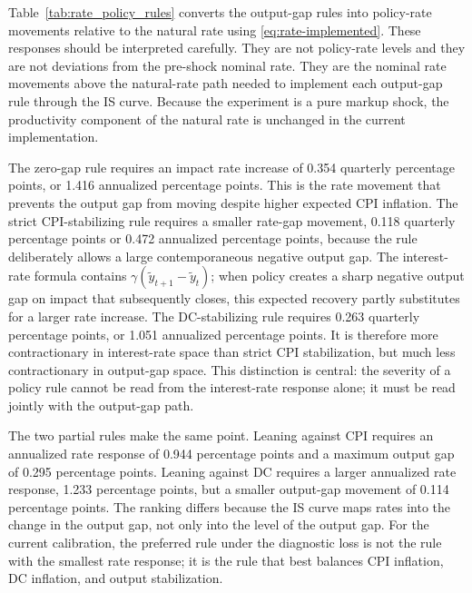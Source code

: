 \documentclass[12pt]{article}
\newcommand{\ytilde}{\tilde y}
\begin{document}
Table~\ref{tab:rate_policy_rules} converts the output-gap rules into policy-rate
movements relative to the natural rate using \eqref{eq:rate-implemented}. These
responses should be interpreted carefully. They are not policy-rate levels and they are
not deviations from the pre-shock nominal rate. They are the nominal rate movements
above the natural-rate path needed to implement each output-gap rule through the IS
curve. Because the experiment is a pure markup shock, the productivity component of the
natural rate is unchanged in the current implementation.

The zero-gap rule requires an impact rate increase of 0.354 quarterly percentage
points, or 1.416 annualized percentage points. This is the rate movement that prevents
the output gap from moving despite higher expected CPI inflation. The strict
CPI-stabilizing rule requires a smaller rate-gap movement, 0.118 quarterly percentage
points or 0.472 annualized percentage points, because the rule deliberately allows a
large contemporaneous negative output gap. The interest-rate formula contains
$\gamma(\ytilde_{t+1}-\ytilde_t)$; when policy creates a sharp negative output gap on
impact that subsequently closes, this expected recovery partly substitutes for a larger
rate increase. The DC-stabilizing rule requires 0.263 quarterly percentage points, or
1.051 annualized percentage points. It is therefore more contractionary in interest-rate
space than strict CPI stabilization, but much less contractionary in output-gap space.
This distinction is central: the severity of a policy rule cannot be read from the
interest-rate response alone; it must be read jointly with the output-gap path.

The two partial rules make the same point. Leaning against CPI requires an annualized
rate response of 0.944 percentage points and a maximum output gap of
0.295 percentage points. Leaning against DC requires a larger annualized rate response,
1.233 percentage points, but a smaller output-gap movement of 0.114 percentage points.
The ranking differs because the IS curve maps rates into the change in the output gap,
not only into the level of the output gap. For the current calibration, the preferred
rule under the diagnostic loss is not the rule with the smallest rate response; it is
the rule that best balances CPI inflation, DC inflation, and output stabilization.
\end{document}
